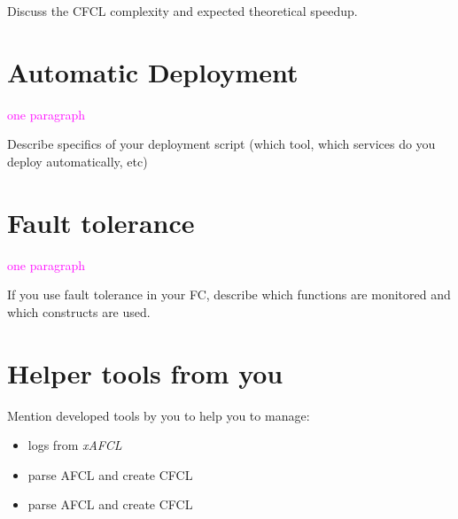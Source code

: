 Discuss the CFCL complexity and expected theoretical speedup.



%
%
%
\section{Automatic Deployment}

\textcolor{magenta}{one paragraph}

Describe specifics of your deployment script (which tool, which services do you deploy automatically, etc)



%
%
%
\section{Fault tolerance}

\textcolor{magenta}{one paragraph}

If you use fault tolerance in your FC, describe which functions are monitored and which constructs are used.


%
%
%
\section{Helper tools from you}

Mention developed tools by you to help you to manage:
\begin{itemize}
    \item logs from \textit{xAFCL}
    \item parse AFCL and create CFCL
    \item parse AFCL and create CFCL
\end{itemize}